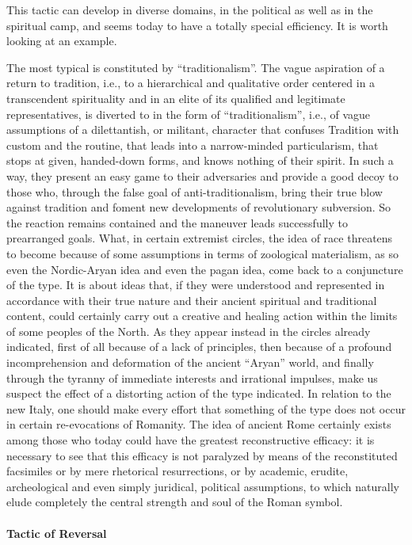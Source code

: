 This tactic can develop in diverse domains, in the political as well as in the spiritual camp, and seems today to have a totally special efficiency. It is worth looking at an example.

The most typical is constituted by ``traditionalism''. The vague aspiration of a return to tradition, i.e., to a hierarchical and qualitative order centered in a transcendent spirituality and in an elite of its qualified and legitimate representatives, is diverted to in the form of ``traditionalism'', i.e., of vague assumptions of a dilettantish, or militant, character that confuses Tradition with custom and the routine, that leads into a narrow-minded particularism, that stops at given, handed-down forms, and knows nothing of their spirit. In such a way, they present an easy game to their adversaries and provide a good decoy to those who, through the false goal of anti-traditionalism, bring their true blow against tradition and foment new developments of revolutionary subversion. So the reaction remains contained and the maneuver leads successfully to prearranged goals. What, in certain extremist circles, the idea of race threatens to become because of some assumptions in terms of zoological materialism, as so even the Nordic-Aryan idea and even the pagan idea, come back to a conjuncture of the type. It is about ideas that, if they were understood and represented in accordance with their true nature and their ancient spiritual and traditional content, could certainly carry out a creative and healing action within the limits of some peoples of the North. As they appear instead in the circles already indicated, first of all because of a lack of principles, then because of a profound incomprehension and deformation of the ancient ``Aryan'' world, and finally through the tyranny of immediate interests and irrational impulses, make us suspect the effect of a distorting action of the type indicated. In relation to the new Italy, one should make every effort that something of the type does not occur in certain re-evocations of Romanity. The idea of ancient Rome certainly exists among those who today could have the greatest reconstructive efficacy: it is necessary to see that this efficacy is not paralyzed by means of the reconstituted facsimiles or by mere rhetorical resurrections, or by academic, erudite, archeological and even simply juridical, political assumptions, to which naturally elude completely the central strength and soul of the Roman symbol.

\paragraph{Tactic of Reversal}


